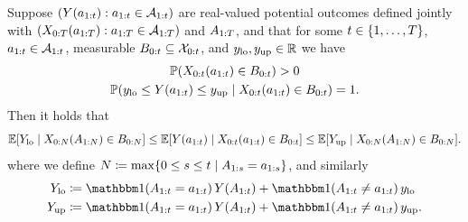 \begin{theorem} \label{thm:causal-bounds}
    Suppose $(Y(a_{1:t}) : a_{1:t} \in \mathcal{A}_{1:t})$ are real-valued potential outcomes defined jointly with $(X_{0:T}(a_{1:T}) : a_{1:T} \in \mathcal{A}_{1:T})$ and $A_{1:T}$, and that for some $t \in \{1, \ldots, T\}$, $a_{1:t} \in \mathcal{A}_{1:t}$, measurable $B_{0:t} \subseteq \mathcal{X}_{0:t}$, and $y_{\mathrm{lo}}, y_{\mathrm{up}} \in \mathbb{R}$ we have
\noindent
% 
    \begin{gather}
        \mathbb{P}(X_{0:t}(a_{1:t}) \in B_{0:t}) > 0 \label{eq:B-positivity-assumption} \\
        \mathbb{P}(y_{\mathrm{lo}} \leq Y(a_{1:t}) \leq y_{\mathrm{up}} \mid X_{0:t}(a_{1:t}) \in B_{0:t}) = 1.  \label{eq:Y-boundedness-assumption}
    \end{gather}
    \noindent Then it holds that
    \begin{equation} \label{eq:causal-bounds-fully-written}
        \mathbb{E}[Y_{\mathrm{lo}} \mid X_{0:N}(A_{1:N}) \in B_{0:N}]
        \leq \mathbb{E}[Y(a_{1:t}) \mid X_{0:t}(a_{1:t}) \in B_{0:t}]
        \leq  \mathbb{E}[Y_{\mathrm{up}} \mid X_{0:N}(A_{1:N}) \in B_{0:N}].
    \end{equation}
    where we define $N \coloneqq \max \{0 \leq s \leq t \mid A_{1:s} = a_{1:s}\}$, and similarly
    \begin{align*}
        \Ylo \coloneqq \ind(\A_{1:\tx} &= \ax_{1:\tx}) \, \Y(\A_{1:\tx}) + \ind(\A_{1:\tx} \neq \ax_{1:\tx}) \, \ylo \\
        \Yup \coloneqq \ind(\A_{1:\tx} &= \ax_{1:\tx}) \, \Y(\A_{1:\tx}) + \ind(\A_{1:\tx} \neq \ax_{1:\tx}) \, \yup.
    \end{align*}


\end{theorem}
